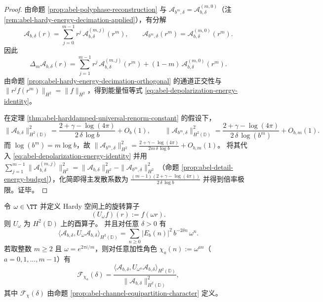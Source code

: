 \begin{proof}
由命题 \ref{prop:abel-polyphase-reconstruction} 与 \(\mathcal A_{b^m,\delta}=\mathcal A_{b,\delta}^{(m,0)}\)（注 \ref{rem:abel-hardy-energy-decimation-applied}），有分解
\[
\mathcal A_{b,\delta}(r)=\sum_{j=0}^{m-1}r^j\,\mathcal A_{b,\delta}^{(m,j)}(r^m),
\qquad
\mathcal A_{b^m,\delta}(r^m)=\mathcal A_{b,\delta}^{(m,0)}(r^m).
\]
因此
\[
\Delta_m\mathcal A_{b,\delta}(r)
=\sum_{j=1}^{m-1}r^j\,\mathcal A_{b,\delta}^{(m,j)}(r^m)+(1-m)\,\mathcal A_{b,\delta}^{(m,0)}(r^m).
\]
由命题 \ref{prop:abel-hardy-energy-decimation-orthogonal} 的通道正交性与 \(\|r^j f(r^m)\|_{H^2}=\|f\|_{H^2}\)，得到能量恒等式 \eqref{eq:abel-depolarization-energy-identity}。
\par
在定理 \ref{thm:abel-harddamped-universal-renorm-constant} 的假设下，
\[
\|\mathcal A_{b,\delta}\|_{H^2(\mathbb D)}^2
=\frac{2+\gamma-\log(4\pi)}{2\,\delta\,\log b}+O_b(1),
\qquad
\|\mathcal A_{b^m,\delta}\|_{H^2(\mathbb D)}^2
=\frac{2+\gamma-\log(4\pi)}{2\,\delta\,\log(b^m)}+O_{b,m}(1).
\]
而 \(\log(b^m)=m\log b\)，故
\(
\|\mathcal A_{b^m,\delta}\|_{H^2}^2=\frac{2+\gamma-\log(4\pi)}{2m\,\delta\,\log b}+O_{b,m}(1)
\)。
将其代入 \eqref{eq:abel-depolarization-energy-identity} 并用
\(
\sum_{j=1}^{m-1}\|\mathcal A_{b,\delta}^{(m,j)}\|_{H^2}^2
=\|\mathcal A_{b,\delta}\|_{H^2}^2-\|\mathcal A_{b^m,\delta}\|_{H^2}^2
\)
（命题 \ref{prop:abel-detail-energy-budget}），化简即得主发散系数为
\(
\frac{(m-1)(2+\gamma-\log(4\pi))}{2\,\delta\,\log b}
\)
并得到倍率极限。证毕。
\end{proof}

\begin{proposition}[加性角色谱的旋转相关实现]\label{prop:abel-character-spectrum-as-rotation-correlation}
令 \(\omega\in\TT\) 并定义 Hardy 空间上的旋转算子
\[
(U_\omega f)(r):=f(\omega r).
\]
则 \(U_\omega\) 为 \(H^2(\mathbb D)\) 上的酉算子。
并且对任意 \(\delta>0\) 有
\[
\boxed{\;
\langle \mathcal A_{b,\delta},U_\omega\mathcal A_{b,\delta}\rangle_{H^2(\mathbb D)}
=\sum_{n\ge 0}|E_b(n)|^2\,b^{-2\delta n}\,\omega^n.\;}
\]
若取整数 \(m\ge 2\) 且 \(\omega=e^{2\pi i/m}\)，则对任意加性角色 \(\chi_a(n):=\omega^{a n}\)（\(a=0,1,\dots,m-1\)）有
\[
\boxed{\;
\mathcal F_{\chi_a}(\delta)
=\frac{\langle \mathcal A_{b,\delta},U_{\omega^{a}}\mathcal A_{b,\delta}\rangle_{H^2(\mathbb D)}}
{\|\mathcal A_{b,\delta}\|_{H^2(\mathbb D)}^2},\;}
\]
其中 \(\mathcal F_\chi(\delta)\) 由命题 \ref{prop:abel-channel-equipartition-character} 定义。
\end{proposition}

